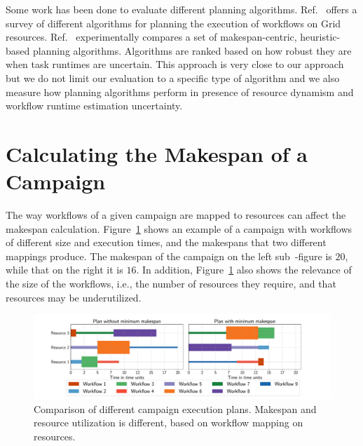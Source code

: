 Some work has been done to evaluate different planning algorithms.
Ref.~\cite{wieczorek2005scheduling} offers a survey of different algorithms for
planning the execution of workflows on Grid resources.
Ref.~\cite{canon2008comparative} experimentally compares a set of
makespan-centric, heuristic-based planning algorithms. Algorithms are ranked
based on how robust they are when task runtimes are uncertain. This approach is
very close to our approach but we do not limit our evaluation to a specific type
of algorithm and we also measure how planning algorithms perform in presence of
resource dynamism and workflow runtime estimation uncertainty.

\section{Calculating the Makespan of a Campaign}
\label{sec:makespan_calc}

The way workflows of a given campaign are mapped to resources can affect the
makespan calculation. Figure~\ref{fig:example_makespan} shows an example of a
campaign with workflows of different size and execution times, and the makespans
that two different mappings produce. The makespan of the campaign on the left
sub~-figure is $20$, while that on the right it is $16$. In addition,
Figure~\ref{fig:example_makespan} also shows the relevance of the size of the
workflows, i.e., the number of resources they require, and that resources may be
underutilized.

\begin{figure}[ht!]
    \centering
    \includegraphics[width=.99\textwidth]{figures/campaign/plan_comp.pdf}
    \caption{Comparison of different campaign execution plans. Makespan and
    resource utilization is different, based on workflow mapping on
    resources.}\label{fig:example_makespan}
\end{figure}

